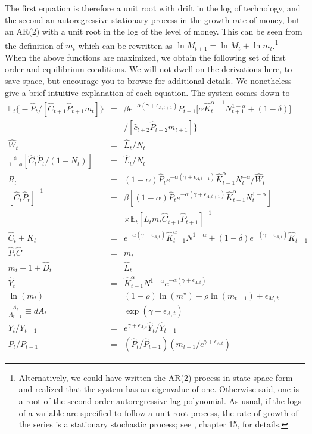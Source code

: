 The first equation is therefore a unit root with drift in the log of technology, and the second an autoregressive stationary process in the growth rate of money, but an AR(2) with a unit root in the log of the level of money. This can be seen from the definition of $m_t$ which can be rewritten as $\ln M_{t+1} = \ln M_t + \ln m_t$.\footnote{Alternatively, we could have written the AR(2) process in state space form and realized that the system has an eigenvalue of one. Otherwise said, one is a root of the second order autoregressive lag polynomial. As usual, if the logs of a variable are specified to follow a unit root process, the rate of growth of the series is a stationary stochastic process; see \citet{Hamilton1994}, chapter 15, for details.}\\

When the above functions are maximized, we obtain the following set of first order and equilibrium conditions. We will not dwell on the derivations here, to save space, but encourage you to browse \citet{CogleyNason1994} for additional details. We nonetheless give a brief intuitive explanation of each equation. The system comes down to
\begin{eqnarray*}
\mathbb{E}_{t}\bigg\{-\widehat{P}_{t}/\left[ \widehat{C}_{t+1}\widehat{P}_{t+1}m_{t}%
\right]\bigg\}&=&\beta e^{-\alpha (\gamma +\epsilon_{A,t+1})}P_{t+1}\Big[\alpha\widehat{K}_{t}^{\alpha -1}N_{t+1}^{1-\alpha }+
(1-\delta )\Big]\\
&&/\left[ 
\widehat{c}_{t+2}\widehat{P}_{t+2}m_{t+1}\right] \bigg\}\\
\widehat{W}_{t}&=&\widehat{L}_{t}/N_{t}\\
\frac{\phi }{1-\phi }\left[ \widehat{C}_{t}\widehat{P}_{t}/\left(
1-N_{t}\right) \right]&=&\widehat{L}_{t}/N_{t}\\
R_{t}&=&(1-\alpha )\widehat{P}_{t}e^{-\alpha (\gamma +\epsilon_{A,t+1})}\widehat{K}_{t-1}^{\alpha}N_{t}^{-\alpha }/\widehat{W}_{t}\\
\left[ \widehat{C}_{t}\widehat{P}_{t}\right] ^{-1}&=&\beta \left[ \left(
1-\alpha \right) \widehat{P}_{t}e^{-\alpha (\gamma +\epsilon_{A,t+1})}\widehat{K}_{t-1}^{\alpha}N_{t}^{1-\alpha }
\right]\\
&& \times  \mathbb{E}_{t}\left[\widehat{L}_{t}m_{t}\widehat{C}_{t+1}\widehat{P}_{t+1}\right] ^{-1}\\
\widehat{C}_t+\widehat{K}_t &=& e^{-\alpha(\gamma+\epsilon_{A,t})}\widehat{K}_{t-1}^\alpha N^{1-\alpha}+(1-\delta)e^{-(\gamma+\epsilon_{A,t})}\widehat{K}_{t-1}\\
\widehat{P}_t\widehat{C} &=& m_t\\
m_t-1+\widehat{D}_t &=& \widehat{L}_t\\
\widehat{Y}_t &=& \widehat{K}_{t-1}^\alpha N^{1-\alpha}e^{-\alpha (\gamma+\epsilon_{A,t})}\\
\ln(m_t) &=& (1-\rho)\ln(m^\star) + \rho\ln(m_{t-1})+\epsilon_{M,t}\\
\frac{A_t}{A_{t-1}}  \equiv  dA_t & = & \exp( \gamma + \epsilon_{A,t})\\
Y_t/Y_{t-1} &=& e^{\gamma+\epsilon_{A,t}}\widehat{Y}_t/\widehat{Y}_{t-1}\\
P_t/P_{t-1} &=& (\widehat{P}_t/\widehat{P}_{t-1})(m_{t-1}/e^{\gamma+\epsilon_{A,t}})
\end{eqnarray*}
